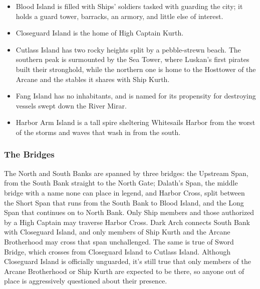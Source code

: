 \documentclass[10pt,a4paper,twoside,twocolumn,openany,bg=print,nodeprecatedcode]{dndbook}
\begin{document}
\begin{itemize}
\item Blood Island is filled with Ships' soldiers tasked with guarding the city; it holds a guard tower, barracks, an armory, and little else of interest.
\item Closeguard Island is the home of High Captain Kurth.
\item Cutlass Island has two rocky heights split by a pebble-strewn beach. The southern peak is surmounted by the Sea Tower, where Luskan's first pirates built their stronghold, while the northern one is home to the Hosttower of the Arcane and the stables it shares with Ship Kurth.
\item Fang Island has no inhabitants, and is named for its propensity for destroying vessels swept down the River Mirar.
\item Harbor Arm Island is a tall spire sheltering Whitesails Harbor from the worst of the storms and waves that wash in from the south.
\end{itemize}

\subsubsection{The Bridges}
The North and South Banks are spanned by three bridges: the Upstream Span, from the South Bank straight to the North Gate; Dalath's Span, the middle bridge with a name none can place in legend, and Harbor Cross, split between the Short Span that runs from the South Bank to Blood Island, and the Long Span that continues on to North Bank. Only Ship members and those authorized by a High Captain may traverse Harbor Cross.
Dark Arch connects South Bank with Closeguard Island, and only members of Ship Kurth and the Arcane Brotherhood may cross that span unchallenged. The same is true of Sword Bridge, which crosses from Closeguard Island to Cutlass Island. Although Closeguard Island is officially unguarded, it's still true that only members of the Arcane Brotherhood or Ship Kurth are expected to be there, so anyone out of place is aggressively questioned about their presence.
\end{document}
